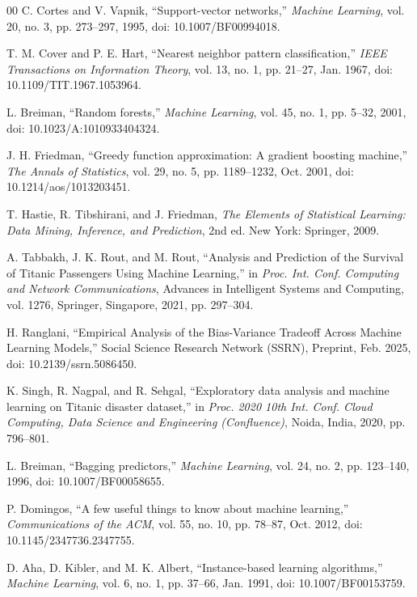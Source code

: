 \documentclass[conference]{IEEEtran}
\begin{document}
\begin{thebibliography}{00}
 C. Cortes and V. Vapnik, ``Support-vector networks,'' \textit{Machine Learning}, vol. 20, no. 3, pp. 273--297, 1995, doi: 10.1007/BF00994018.

 T. M. Cover and P. E. Hart, ``Nearest neighbor pattern classification,'' \textit{IEEE Transactions on Information Theory}, vol. 13, no. 1, pp. 21--27, Jan. 1967, doi: 10.1109/TIT.1967.1053964.

 L. Breiman, ``Random forests,'' \textit{Machine Learning}, vol. 45, no. 1, pp. 5--32, 2001, doi: 10.1023/A:1010933404324.

 J. H. Friedman, ``Greedy function approximation: A gradient boosting machine,'' \textit{The Annals of Statistics}, vol. 29, no. 5, pp. 1189--1232, Oct. 2001, doi: 10.1214/aos/1013203451.

 T. Hastie, R. Tibshirani, and J. Friedman, \textit{The Elements of Statistical Learning: Data Mining, Inference, and Prediction}, 2nd ed. New York: Springer, 2009.

 A. Tabbakh, J. K. Rout, and M. Rout, ``Analysis and Prediction of the Survival of Titanic Passengers Using Machine Learning,'' in \textit{Proc. Int. Conf. Computing and Network Communications}, Advances in Intelligent Systems and Computing, vol. 1276, Springer, Singapore, 2021, pp. 297--304.

 H. Ranglani, ``Empirical Analysis of the Bias-Variance Tradeoff Across Machine Learning Models,'' Social Science Research Network (SSRN), Preprint, Feb. 2025, doi: 10.2139/ssrn.5086450.

 K. Singh, R. Nagpal, and R. Sehgal, ``Exploratory data analysis and machine learning on Titanic disaster dataset,'' in \textit{Proc. 2020 10th Int. Conf. Cloud Computing, Data Science and Engineering (Confluence)}, Noida, India, 2020, pp. 796--801.

 L. Breiman, ``Bagging predictors,'' \textit{Machine Learning}, vol. 24, no. 2, pp. 123--140, 1996, doi: 10.1007/BF00058655.

 P. Domingos, ``A few useful things to know about machine learning,'' \textit{Communications of the ACM}, vol. 55, no. 10, pp. 78--87, Oct. 2012, doi: 10.1145/2347736.2347755.

 D. Aha, D. Kibler, and M. K. Albert, ``Instance-based learning algorithms,'' \textit{Machine Learning}, vol. 6, no. 1, pp. 37--66, Jan. 1991, doi: 10.1007/BF00153759.


\end{thebibliography}
\end{document}
